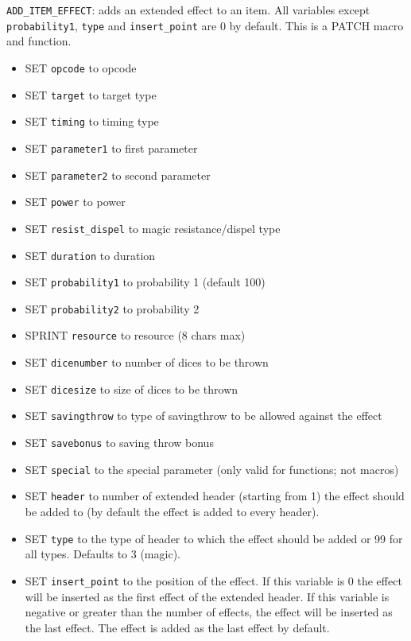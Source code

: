 \documentclass{article}
\begin{document}
\verb+ADD_ITEM_EFFECT+: adds an extended effect to an item. All variables except \verb+probability1+, \verb+type+ and \verb+insert_point+ are 0 by default.
This is a PATCH macro and function.
\begin{itemize}
\item SET \verb+opcode+ to opcode
\item SET \verb+target+ to target type
\item SET \verb+timing+ to timing type
\item SET \verb+parameter1+ to first parameter
\item SET \verb+parameter2+ to second parameter
\item SET \verb+power+ to power
\item SET \verb+resist_dispel+ to magic resistance/dispel type
\item SET \verb+duration+ to duration
\item SET \verb+probability1+ to probability 1 (default 100)
\item SET \verb+probability2+ to probability 2
\item SPRINT \verb+resource+ to resource (8 chars max)
\item SET \verb+dicenumber+ to number of dices to be thrown
\item SET \verb+dicesize+ to size of dices to be thrown
\item SET \verb+savingthrow+ to type of savingthrow to be allowed against the effect
\item SET \verb+savebonus+ to saving throw bonus
\item SET \verb+special+ to the special parameter (only valid for functions; not macros)
\item SET \verb+header+ to number of extended header (starting from 1) the effect should be added to (by default the effect is added to every header).
\item SET \verb+type+ to the type of header to which the effect should be added or 99 for all types. Defaults to 3 (magic).
\item SET \verb+insert_point+ to the position of the effect. If this variable is 0 the effect will be inserted as the first effect of the extended header. If this variable is negative or greater than the number of effects, the effect will be inserted as the last effect. The effect is added as the last effect by default.
\end{itemize}
\end{document}
